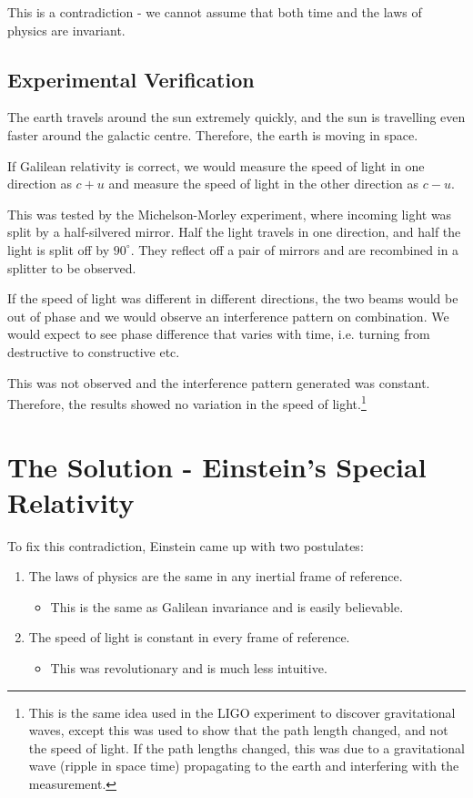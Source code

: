 This is a contradiction - we cannot assume that both time and the laws of physics are invariant.

\subsection{Experimental Verification}
The earth travels around the sun extremely quickly, and the sun is travelling even faster around the galactic centre. Therefore, the earth is moving in space. 

If Galilean relativity is correct, we would measure the speed of light in one direction as $c + u$ and measure the speed of light in the other direction as $c - u$. 

This was tested by the Michelson-Morley experiment, where incoming light was split by a half-silvered mirror. Half the light travels in one direction, and half the light is split off by $90^\circ$. They reflect off a pair of mirrors and are recombined in a splitter to be observed.

If the speed of light was different in different directions, the two beams would be out of phase and we would observe an interference pattern on combination. We would expect to see phase difference that varies with time, i.e. turning from destructive to constructive etc.

This was not observed and the interference pattern generated was constant. Therefore, the results showed no variation in the speed of light.\footnote{This is the same idea used in the LIGO experiment to discover gravitational waves, except this was used to show that the path length changed, and not the speed of light. If the path lengths changed, this was due to a gravitational wave (ripple in space time) propagating to the earth and interfering with the measurement.}

\section{The Solution - Einstein's Special Relativity}
To fix this contradiction, Einstein came up with two postulates:
\begin{enumerate}
    \item The laws of physics are the same in any inertial frame of reference.
    \begin{itemize}
        \item This is the same as Galilean invariance and is easily believable.
    \end{itemize}
    \item The speed of light is constant in every frame of reference.
    \begin{itemize}
        \item This was revolutionary and is much less intuitive.
    \end{itemize}
\end{enumerate}

